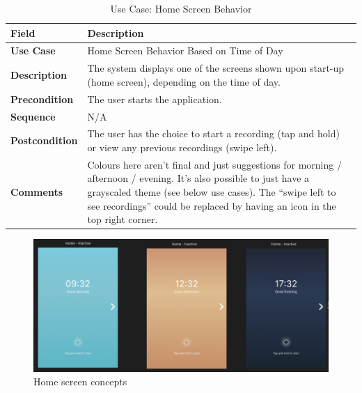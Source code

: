 \documentclass[12pt]{article}
\begin{document}
\begin{table}[h!]
\centering
\begin{tabular}{|p{3cm}|p{11cm}|}
\hline
\textbf{Field} & \textbf{Description} \\
\hline
\textbf{Use Case}   & Home Screen Behavior Based on Time of Day \\
\hline
\textbf{Description} & The system displays one of the screens shown upon start-up (home screen), depending on the time of day. \\
\hline
\textbf{Precondition} & The user starts the application. \\
\hline
\textbf{Sequence} & N/A \\
\hline
\textbf{Postcondition} & The user has the choice to start a recording (tap and hold) or view any previous recordings (swipe left). \\
\hline
\textbf{Comments} & Colours here aren’t final and just suggestions for morning / afternoon / evening. It’s also possible to just have a grayscaled theme (see below use cases). The “swipe left to see recordings” could be replaced by having an icon in the top right corner. \\
\hline
\end{tabular}
\caption{Use Case: Home Screen Behavior}
\end{table}

\begin{figure}[h!]
    \centering
    \includegraphics[width=\textwidth]{Project_Screenshots/GUIconcept.png}
    \caption{Home screen concepts}
\end{figure}
\end{document}
